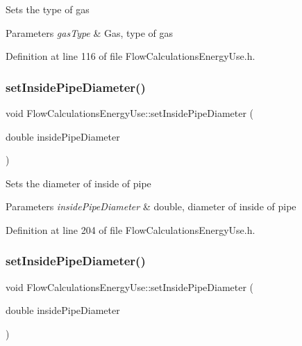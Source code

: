 Sets the type of gas


\begin{DoxyParams}{Parameters}
{\em gas\+Type} & Gas, type of gas \\
\hline
\end{DoxyParams}


Definition at line 116 of file Flow\+Calculations\+Energy\+Use.\+h.

\mbox{\label{class_flow_calculations_energy_use_a616486580460b616a7a8c4935119cd6c}} 
\subsubsection{\texorpdfstring{set\+Inside\+Pipe\+Diameter()}{setInsidePipeDiameter()}\hspace{0.1cm}{\footnotesize\ttfamily [1/3]}}
{\footnotesize\ttfamily void Flow\+Calculations\+Energy\+Use\+::set\+Inside\+Pipe\+Diameter (\begin{DoxyParamCaption}\item[{double}]{inside\+Pipe\+Diameter }\end{DoxyParamCaption})\hspace{0.3cm}{\ttfamily [inline]}}

Sets the diameter of inside of pipe


\begin{DoxyParams}{Parameters}
{\em inside\+Pipe\+Diameter} & double, diameter of inside of pipe \\
\hline
\end{DoxyParams}


Definition at line 204 of file Flow\+Calculations\+Energy\+Use.\+h.

\mbox{\label{class_flow_calculations_energy_use_a616486580460b616a7a8c4935119cd6c}} 
\subsubsection{\texorpdfstring{set\+Inside\+Pipe\+Diameter()}{setInsidePipeDiameter()}\hspace{0.1cm}{\footnotesize\ttfamily [2/3]}}
{\footnotesize\ttfamily void Flow\+Calculations\+Energy\+Use\+::set\+Inside\+Pipe\+Diameter (\begin{DoxyParamCaption}\item[{double}]{inside\+Pipe\+Diameter }\end{DoxyParamCaption})\hspace{0.3cm}{\ttfamily [inline]}}

